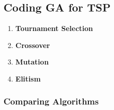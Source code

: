 \documentclass{article}
\begin{document}
\subsection{Coding GA for TSP}
\begin{enumerate}

\item \textbf{Tournament Selection}
	
	
\newpage

\item \textbf{Crossover}
	
	
\item \textbf{Mutation}
	
	
\item \textbf{Elitism}
		
	
\end{enumerate}

\subsubsection{Comparing Algorithms}
\newpage
\end{document}
